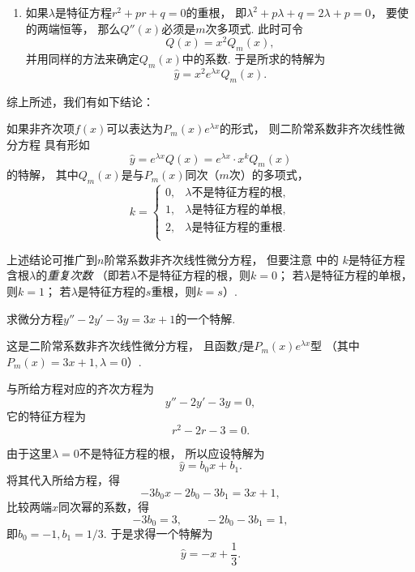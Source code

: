 \begin{enumerate}
	\item 如果\(\lambda\)是特征方程\(r^2+pr+q=0\)的重根，
	即\(\lambda^2+p\lambda+q=2\lambda+p=0\)，
	要使  的两端恒等，
	那么\(Q''(x)\)必须是\(m\)次多项式.
	此时可令\[
		Q(x) = x^2 Q_m(x),
	\]
	并用同样的方法来确定\(Q_m(x)\)中的系数.
	于是所求的特解为\begin{equation}
		\hat{y} = x^2 e^{\lambda x} Q_m(x).
	\end{equation}
\end{enumerate}

综上所述，我们有如下结论：
\begin{proposition}
如果非齐次项\(f(x)\)可以表达为\(P_m(x) e^{\lambda x}\)的形式，
则二阶常系数非齐次线性微分方程 
具有形如\begin{equation}\label{equation:微分方程.二阶常系数齐次线性微分方程.特解1}
	\hat{y} = e^{\lambda x} Q(x)
	= e^{\lambda x} \cdot x^k Q_m(x)
\end{equation}的特解，
其中\(Q_m(x)\)是与\(P_m(x)\)同次（\(m\)次）的多项式，\[
	k = \left\{ \begin{array}{ll}
		0, & \text{\(\lambda\)不是特征方程的根}, \\
		1, & \text{\(\lambda\)是特征方程的单根}, \\
		2, & \text{\(\lambda\)是特征方程的重根}. \\
	\end{array} \right.
\]
\end{proposition}

上述结论可推广到\(n\)阶常系数非齐次线性微分方程，
但要注意  中的
\(k\)是特征方程含根\(\lambda\)的\emph{重复次数}
（即若\(\lambda\)不是特征方程的根，则\(k=0\)；
若\(\lambda\)是特征方程的单根，则\(k=1\)；
若\(\lambda\)是特征方程的\(s\)重根，则\(k=s\)）.

\begin{example}
求微分方程\(y''-2y'-3y=3x+1\)的一个特解.
\begin{solution}
这是二阶常系数非齐次线性微分方程，
且函数\(f\)是\(P_m(x) e^{\lambda x}\)型
（其中\(P_m(x) = 3x+1, \lambda=0\)）.

与所给方程对应的齐次方程为\[
	y''-2y'-3y=0,
\]
它的特征方程为\[
	r^2-2r-3=0.
\]

由于这里\(\lambda=0\)不是特征方程的根，
所以应设特解为\[
	\hat{y} = b_0 x + b_1.
\]
将其代入所给方程，得\[
	-3 b_0 x - 2 b_0 - 3 b_1 = 3x+1,
\]
比较两端\(x\)同次幂的系数，得\[
	-3 b_0 = 3, \qquad -2 b_0 - 3 b_1 = 1,
\]
即\(b_0=-1, b_1=1/3\).
于是求得一个特解为\[
	\hat{y} = -x + \frac{1}{3}.
\]
\end{solution}
\end{example}

